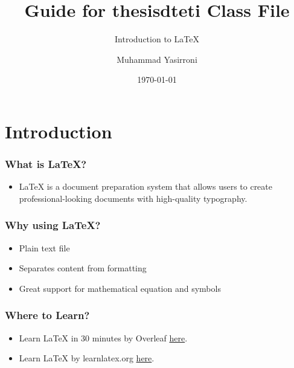 \documentclass{beamer}
\title{Guide for thesisdteti Class File}
\subtitle{Introduction to LaTeX}
\author{Muhammad Yasirroni}
\institute{Universitas Gadjah Mada}
\date{\today}
\begin{document}
\begin{frame}
  \titlepage
\end{frame}

\section{Introduction}
\begin{frame}
  \frametitle{What is LaTeX?}
  \begin{itemize}
    \item LaTeX is a document preparation system that allows users to create professional-looking documents with high-quality typography.
  \end{itemize}
\end{frame}

\begin{frame}
  \frametitle{Why using LaTeX?}
  \begin{itemize}
    \item Plain text file
    \item Separates content from formatting
    \item Great support for mathematical equation and symbols
  \end{itemize}
\end{frame}

\begin{frame}
  \frametitle{Where to Learn?}
  \begin{itemize}
    \item Learn LaTeX in 30 minutes by Overleaf \href{https://www.overleaf.com/learn/latex/Learn\_LaTeX\_in\_30\_minutes}{here}.
    \item Learn LaTeX by learnlatex.org \href{https://www.learnlatex.org/en/}{here}.
  \end{itemize}
\end{frame}
\end{document}
